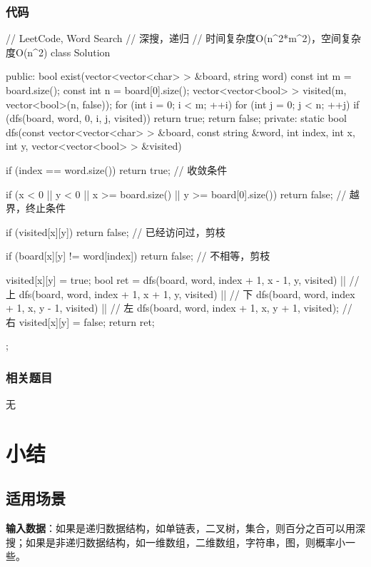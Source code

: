 \subsubsection{代码}
\begin{Code}
	// LeetCode, Word Search
	// 深搜，递归
	// 时间复杂度O(n^2*m^2)，空间复杂度O(n^2)
	class Solution {
		public:
		bool exist(vector<vector<char> > &board, string word) {
			const int m = board.size();
			const int n = board[0].size();
			vector<vector<bool> > visited(m, vector<bool>(n, false));
			for (int i = 0; i < m; ++i)
			for (int j = 0; j < n; ++j)
			if (dfs(board, word, 0, i, j, visited))
			return true;
			return false;
		}
		private:
		static bool dfs(const vector<vector<char> > &board, const string &word,
		int index, int x, int y, vector<vector<bool> > &visited) {
			if (index == word.size())
			return true; // 收敛条件
			
			if (x < 0 || y < 0 || x >= board.size() || y >= board[0].size())
			return false;  // 越界，终止条件
			
			if (visited[x][y]) return false; // 已经访问过，剪枝
			
			if (board[x][y] != word[index]) return false; // 不相等，剪枝
			
			visited[x][y] = true;
			bool ret = dfs(board, word, index + 1, x - 1, y, visited) || // 上
			dfs(board, word, index + 1, x + 1, y, visited)    || // 下
			dfs(board, word, index + 1, x, y - 1, visited)    || // 左
			dfs(board, word, index + 1, x, y + 1, visited);      // 右
			visited[x][y] = false;
			return ret;
		}
	};
\end{Code}


\subsubsection{相关题目}
\begindot
\item 无
\myenddot


\section{小结} %
\label{sec:dfs-template}


\subsection{适用场景}

\textbf{输入数据}：如果是递归数据结构，如单链表，二叉树，集合，则百分之百可以用深搜；如果是非递归数据结构，如一维数组，二维数组，字符串，图，则概率小一些。


